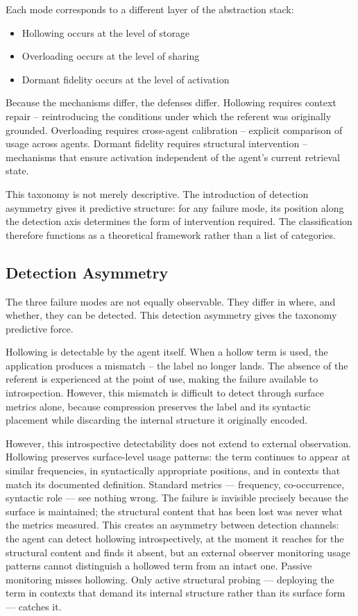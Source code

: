 \documentclass[11pt]{article}
\begin{document}
Each mode corresponds to a different layer of the abstraction stack:

\begin{itemize}
\item Hollowing occurs at the level of storage
\item Overloading occurs at the level of sharing
\item Dormant fidelity occurs at the level of activation
\end{itemize}

Because the mechanisms differ, the defenses differ. Hollowing requires context repair -- reintroducing the conditions under which the referent was originally grounded. Overloading requires cross-agent calibration -- explicit comparison of usage across agents. Dormant fidelity requires structural intervention -- mechanisms that ensure activation independent of the agent's current retrieval state.

This taxonomy is not merely descriptive. The introduction of detection asymmetry gives it predictive structure: for any failure mode, its position along the detection axis determines the form of intervention required. The classification therefore functions as a theoretical framework rather than a list of categories.

\subsection{Detection Asymmetry}

The three failure modes are not equally observable. They differ in where, and whether, they can be detected. This detection asymmetry gives the taxonomy predictive force.

Hollowing is detectable by the agent itself. When a hollow term is used, the application produces a mismatch -- the label no longer lands. The absence of the referent is experienced at the point of use, making the failure available to introspection. However, this mismatch is difficult to detect through surface metrics alone, because compression preserves the label and its syntactic placement while discarding the internal structure it originally encoded.

However, this introspective detectability does not extend to external observation. Hollowing preserves surface-level usage patterns: the term continues to appear at similar frequencies, in syntactically appropriate positions, and in contexts that match its documented definition. Standard metrics --- frequency, co-occurrence, syntactic role --- see nothing wrong. The failure is invisible precisely because the surface is maintained; the structural content that has been lost was never what the metrics measured. This creates an asymmetry between detection channels: the agent can detect hollowing introspectively, at the moment it reaches for the structural content and finds it absent, but an external observer monitoring usage patterns cannot distinguish a hollowed term from an intact one. Passive monitoring misses hollowing. Only active structural probing --- deploying the term in contexts that demand its internal structure rather than its surface form --- catches it.
\end{document}
